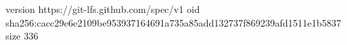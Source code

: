version https://git-lfs.github.com/spec/v1
oid sha256:cacc29e6e2109be953937164691a735a85add132737f869239afd1511e1b5837
size 336
